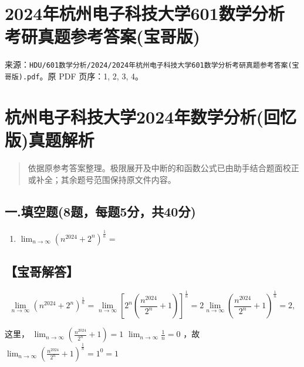 \documentclass[11pt,fontset=fandol]{ctexart}
\providecommand{\tightlist}{\setlength{\itemsep}{0pt}\setlength{\parskip}{0pt}}
\begin{document}
\section{2024年杭州电子科技大学601数学分析考研真题参考答案(宝哥版)}\label{ux5e74ux676dux5ddeux7535ux5b50ux79d1ux6280ux5927ux5b66601ux6570ux5b66ux5206ux6790ux8003ux7814ux771fux9898ux53c2ux8003ux7b54ux6848ux5b9dux54e5ux7248}

来源：\texttt{HDU/601数学分析/2024/2024年杭州电子科技大学601数学分析考研真题参考答案(宝哥版).pdf}。原
PDF 页序：1, 2, 3, 4。

\section{杭州电子科技大学2024年数学分析(回忆版)真题解析}\label{ux676dux5ddeux7535ux5b50ux79d1ux6280ux5927ux5b662024ux5e74ux6570ux5b66ux5206ux6790ux56deux5fc6ux7248ux771fux9898ux89e3ux6790}

\begin{quote}
依据原参考答案整理。极限展开及中断的和函数公式已由助手结合题面校正或补全；其余题号范围保持原文件内容。
\end{quote}

\subsection{一.填空题(8题，每题5分，共40分)}\label{ux4e00.ux586bux7a7aux98988ux9898ux6bcfux98985ux5206ux517140ux5206}

\begin{enumerate}
\def\labelenumi{\arabic{enumi}.}
\tightlist
\item
  \(\lim _ { n \to \infty } ( n ^ { 2 0 2 4 } + 2 ^ { n } ) ^ { \frac { 1 } { n } } =\)
\end{enumerate}

\subsection{【宝哥解答】}\label{ux5b9dux54e5ux89e3ux7b54}

\[
\lim _ { n \to \infty } ( n ^ { 2 0 2 4 } + 2 ^ { n } ) ^ { \frac { 1 } { n } } = \lim _ { n \to \infty } \left[ 2 ^ { n } ( { \frac { n ^ { 2 0 2 4 } } { 2 ^ { n } } } + 1 ) \right] ^ { \frac { 1 } { n } } = 2 \lim _ { n \to \infty } ( { \frac { n ^ { 2 0 2 4 } } { 2 ^ { n } } } + 1 ) ^ { \frac { 1 } { n } } = 2 ,
\]

这里，
\(\lim _ { n \to \infty } ( { \frac { n ^ { 2 0 2 4 } } { 2 ^ { n } } } + 1 ) = 1\)
\(\lim _ { n \to \infty } { \frac { 1 } { n } } = 0\) ，故
\(\lim _ { n \to \infty } ( { \frac { n ^ { 2 0 2 4 } } { 2 ^ { n } } } + 1 ) ^ { \frac { 1 } { n } } = 1 ^ { 0 } = 1\)
\end{document}
